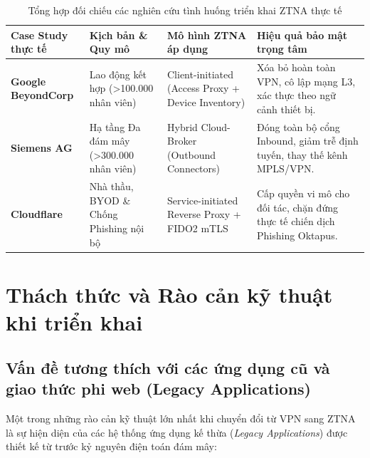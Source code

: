 \begin{table}[htbp]
\centering
\caption{Tổng hợp đối chiếu các nghiên cứu tình huống triển khai ZTNA thực tế}
\label{tab:ztna_use_cases}
\small
\begin{tabular}{|>{\raggedright\arraybackslash}p{2.9cm}|>{\raggedright\arraybackslash}p{3.2cm}|>{\raggedright\arraybackslash}p{3.4cm}|>{\raggedright\arraybackslash}p{3.8cm}|}
\hline
\textbf{Case Study thực tế} & \textbf{Kịch bản \& Quy mô} & \textbf{Mô hình ZTNA áp dụng} & \textbf{Hiệu quả bảo mật trọng tâm} \\ \hline
\textbf{Google BeyondCorp} & Lao động kết hợp (>100.000 nhân viên) & Client-initiated (Access Proxy + Device Inventory) & Xóa bỏ hoàn toàn VPN, cô lập mạng L3, xác thực theo ngữ cảnh thiết bị. \\ \hline
\textbf{Siemens AG} & Hạ tầng Đa đám mây (>300.000 nhân viên) & Hybrid Cloud-Broker (Outbound Connectors) & Đóng toàn bộ cổng Inbound, giảm trễ định tuyến, thay thế kênh MPLS/VPN. \\ \hline
\textbf{Cloudflare} & Nhà thầu, BYOD \& Chống Phishing nội bộ & Service-initiated Reverse Proxy + FIDO2 mTLS & Cấp quyền vi mô cho đối tác, chặn đứng thực tế chiến dịch Phishing Oktapus. \\ \hline
\end{tabular}
\end{table}

\section{Thách thức và Rào cản kỹ thuật khi triển khai}
\label{sec:5_2}

\subsection{Vấn đề tương thích với các ứng dụng cũ và giao thức phi web (Legacy Applications)}
\label{subsec:5_2_1}

Một trong những rào cản kỹ thuật lớn nhất khi chuyển đổi từ VPN sang ZTNA là sự hiện diện của các hệ thống ứng dụng kế thừa (\textit{Legacy Applications}) được thiết kế từ trước kỷ nguyên điện toán đám mây:


